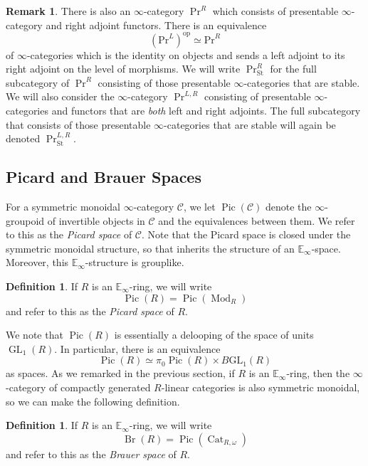 \documentclass[10pt]{amsart}
\theoremstyle{plain}
\theoremstyle{definition}
\newtheorem{definition}[theorem]{Definition}
\newtheorem{rmk}[theorem]{Remark}
\DeclareMathOperator{\Mod}{Mod}
\DeclareMathOperator{\Pic}{Pic}
\DeclareMathOperator{\GL}{GL}
\DeclareMathOperator{\Br}{Br}
\DeclareMathOperator{\Cat}{Cat}
\newcommand{\St}{\mathrm{St}}
\newcommand{\oop}{\mathrm{op}}
\newcommand{\bE}{\mathbb{E}}
\newcommand{\cC}{\mathcal{C}}
\begin{document}
\begin{rmk}
  There is also an $\infty$-category $\Pr^R$ which consists of presentable $\infty$-category and right adjoint functors.
  There is an equivalence
  \[
  (\mathrm{Pr}^L)^{\oop} \simeq \mathrm{Pr}^{R}
  \]
  of $\infty$-categories which is the identity on objects and sends a left adjoint to its right adjoint on the level of morphisms.
  We will write $\Pr^{R}_{\St}$ for the full subcategory of $\Pr^R$ consisting of those presentable $\infty$-categories that are stable.
  We will also consider the $\infty$-category $\Pr^{L,R}$ consisting of presentable $\infty$-categories and functors that are \emph{both} left and right adjoints.
  The full subcategory that consists of those presentable $\infty$-categories that are stable will again be denoted $\Pr^{L,R}_{\St}$.
\end{rmk}

\subsection{Picard and Brauer Spaces}

For a symmetric monoidal $\infty$-category $\cC$, we let $\Pic(\cC)$ denote the $\infty$-groupoid of invertible objects in $\cC$ and the equivalences between them.
We refer to this as the \emph{Picard space} of $\cC$.
Note that the Picard space is closed under the symmetric monoidal structure, so that inherits the structure of an $\bE_\infty$-space.
Moreover, this $\bE_\infty$-structure is grouplike.

\begin{definition}
If $R$ is an $\bE_\infty$-ring, we will write
\[
\Pic(R) = \Pic(\Mod_{R})
\]
and refer to this as the \emph{Picard space} of $R$.
\end{definition}

We note that $\Pic(R)$ is essentially a delooping of the space of units $\GL_1(R)$.
In particular, there is an equivalence
\[
\Pic(R) \simeq \pi_0 \Pic(R) \times B\mathrm{GL}_1(R)
\]
as spaces.
As we remarked in the previous section, if $R$ is an $\bE_\infty$-ring, then the $\infty$-category of compactly generated $R$-linear categories is also symmetric monoidal, so we can make the following definition.

\begin{definition} \label{def:Brauer_space}
If $R$ is an $\bE_\infty$-ring, we will write
\[
\Br(R) = \Pic(\Cat_{R,\omega})
\]
and refer to this as the \emph{Brauer space} of $R$.
\end{definition}
\end{document}
